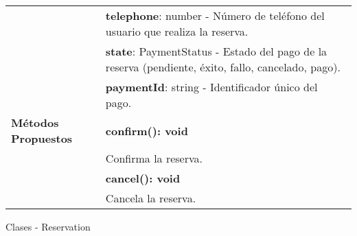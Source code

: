 \begin{clases}
\begin{tabular}{|>{\raggedright\arraybackslash}p{4cm}|p{12cm}|}
		                              & \textbf{telephone}: number - Número de teléfono del usuario que realiza la reserva.                                                                                                                                                                                                                                                                    \\
		                              & \textbf{state}: PaymentStatus - Estado del pago de la reserva (pendiente, éxito, fallo, cancelado, pago).                                                                                                                                                                                                                                              \\
		                              & \textbf{paymentId}: string - Identificador único del pago.                                                                                                                                                                                                                                                                                             \\
		\hline
		\textbf{Métodos Propuestos}   & \textbf{confirm(): void}                                                                                                                                                                                                                                                                                                                               \\
		                              & Confirma la reserva.                                                                                                                                                                                                                                                                                                                                   \\
		                              & \textbf{cancel(): void}                                                                                                                                                                                                                                                                                                                                \\
		                              & Cancela la reserva.                                                                                                                                                                                                                                                                                                                                    \\
		\hline
	\end{tabular}
	\caption{Clases - Reservation}
\end{clases}